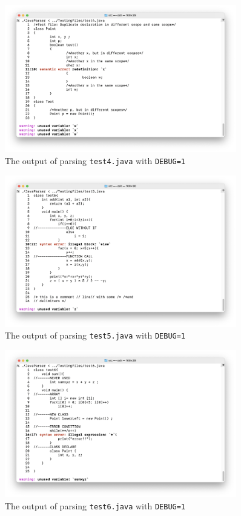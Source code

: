 \documentclass[12pt]{article}
\begin{document}
\begin{figure}
\begin{center}
\includegraphics[width=0.9\textwidth]{Screenshots/test4}
\end{center}
\caption{The output of parsing \texttt{test4.java} with \texttt{DEBUG=1}}
\label{test1}
\end{figure}
\begin{figure}
\begin{center}
\includegraphics[width=0.9\textwidth]{Screenshots/test5}
\end{center}
\caption{The output of parsing \texttt{test5.java} with \texttt{DEBUG=1}}
\label{test1}
\end{figure}
\begin{figure}
\begin{center}
\includegraphics[width=0.9\textwidth]{Screenshots/test6}
\end{center}
\caption{The output of parsing \texttt{test6.java} with \texttt{DEBUG=1}}
\label{test1}
\end{figure}

\newpage

\end{document}
